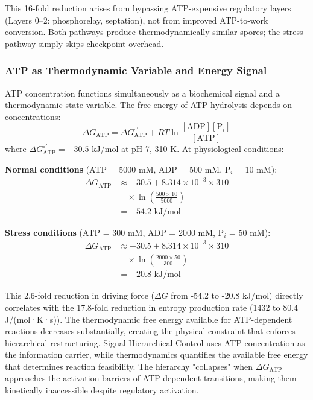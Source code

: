 \documentclass[twocolumn,11pt]{article}
\begin{document}
This 16-fold reduction arises from bypassing ATP-expensive regulatory layers (Layers 0--2: phosphorelay, septation), not from improved ATP-to-work conversion. Both pathways produce thermodynamically similar spores; the stress pathway simply skips checkpoint overhead.

\subsubsection{ATP as Thermodynamic Variable and Energy Signal}

ATP concentration functions simultaneously as a biochemical signal and a thermodynamic state variable. The free energy of ATP hydrolysis depends on concentrations:
\begin{equation}
    \Delta G_{\text{ATP}} = \Delta G^{\circ'}_{\text{ATP}} + RT \ln\frac{[\text{ADP}][\text{P}_i]}{[\text{ATP}]}
\end{equation}
where $\Delta G^{\circ'}_{\text{ATP}} = -30.5$ kJ/mol at pH 7, 310 K. At physiological conditions:

\textbf{Normal conditions} (ATP = 5000 mM, ADP = 500 mM, P$_i$ = 10 mM):
\begin{equation}
\begin{split}
    \Delta G_{\text{ATP}} &\approx -30.5 + 8.314 \times 10^{-3} \times 310 \\
    &\quad \times \ln\left(\frac{500 \times 10}{5000}\right) \\
    &= -54.2 \text{ kJ/mol}
\end{split}
\end{equation}

\textbf{Stress conditions} (ATP = 300 mM, ADP = 2000 mM, P$_i$ = 50 mM):
\begin{equation}
\begin{split}
    \Delta G_{\text{ATP}} &\approx -30.5 + 8.314 \times 10^{-3} \times 310 \\
    &\quad \times \ln\left(\frac{2000 \times 50}{300}\right) \\
    &= -20.8 \text{ kJ/mol}
\end{split}
\end{equation}

This 2.6-fold reduction in driving force ($\Delta G$ from -54.2 to -20.8 kJ/mol) directly correlates with the 17.8-fold reduction in entropy production rate (1432 to 80.4 J/(mol·K·s)). The thermodynamic free energy available for ATP-dependent reactions decreases substantially, creating the physical constraint that enforces hierarchical restructuring. Signal Hierarchical Control uses ATP concentration as the information carrier, while thermodynamics quantifies the available free energy that determines reaction feasibility. The hierarchy "collapses" when $\Delta G_{\text{ATP}}$ approaches the activation barriers of ATP-dependent transitions, making them kinetically inaccessible despite regulatory activation.
\end{document}
